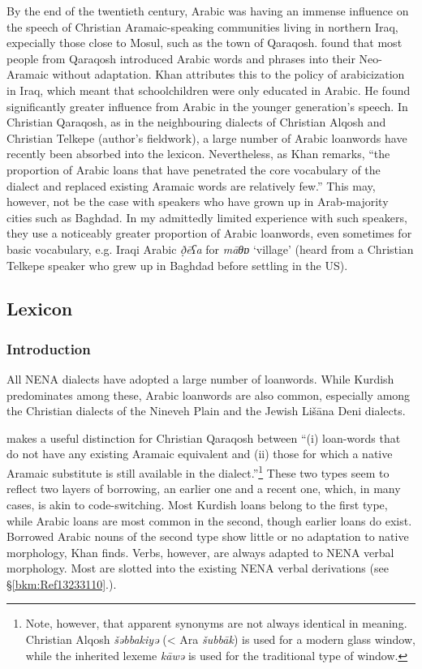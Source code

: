 \documentclass[output=paper]{langsci/langscibook}
\begin{document}
By the end of the twentieth century, Arabic was having an immense influence on the speech of Christian Aramaic-speaking communities living in northern Iraq, expecially those close to Mosul, such as the town of Qaraqosh. \citep[9]{Khan2002} found that most people from Qaraqosh introduced Arabic words and phrases into their Neo-Aramaic without adaptation.  Khan attributes this to the policy of arabicization in Iraq, which meant that schoolchildren were only educated in Arabic. He found significantly greater influence from Arabic in the younger generation’s speech. In Christian Qaraqosh, as in the neighbouring dialects of Christian Alqosh and Christian Telkepe (author’s fieldwork), a large number of Arabic loanwords have recently been absorbed into the lexicon. Nevertheless, as Khan remarks, “the proportion of Arabic loans that have penetrated the core vocabulary of the dialect and replaced existing Aramaic words are relatively few.” This may, however, not be the case with speakers who have grown up in Arab-majority cities such as Baghdad. In my admittedly limited experience with such speakers, they use a noticeably greater proportion of Arabic loanwords, even sometimes for basic vocabulary, e.g. Iraqi Arabic \textit{ð̣ēʕa} for \textit{māθɒ} ‘village’ (heard from a Christian Telkepe speaker who grew up in Baghdad before settling in the US).

\subsection{Lexicon}
\subsubsection{\label{bkm:Ref13232790}Introduction}

All NENA dialects have adopted a large number of loanwords. While Kurdish predominates among these, Arabic loanwords are also common, especially among the Christian dialects of the Nineveh Plain and the Jewish Lišāna Deni dialects.

\citet[516]{Khan2002} makes a useful distinction for Christian Qaraqosh between “(i) loan-words that do not have any existing Aramaic equivalent and (ii) those for which a native Aramaic substitute is still available in the dialect.”\footnote{Note, however, that apparent synonyms are not always identical in meaning. Christian Alqosh \textit{šəbbakiyə} (< Ara \textit{šubbāk}) is used for a modern glass window, while the inherited lexeme \textit{kāwə} is used for the traditional type of window.} These two types seem to reflect two layers of borrowing, an earlier one and a recent one, which, in many cases, is akin to code-switching. Most Kurdish loans belong to the first type, while Arabic loans are most common in the second, though earlier loans do exist. Borrowed Arabic nouns of the second type show little or no adaptation to native morphology, Khan finds. Verbs, however, are always adapted to NENA verbal morphology. Most are slotted into the existing NENA verbal derivations (see §\ref{bkm:Ref13233110}.).
\end{document}
